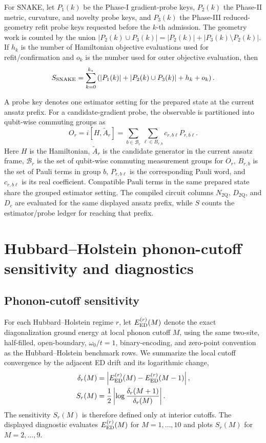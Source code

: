 \documentclass[
  reprint,
  amsmath,
  amssymb,
  aps,
  pra,
  nofootinbib,
  superscriptaddress,
  floatfix
]{revtex4-2}
\newcommand{\twq}{\mathrm{2Q}}
\begin{document}
For SNAKE, let \(P_1(k)\) be the Phase-I gradient-probe keys, \(P_2(k)\) the Phase-II metric, curvature, and novelty probe keys, and \(P_3(k)\) the Phase-III reduced-geometry refit probe keys requested before the \(k\)-th admission.  The geometry work is counted by the union \(|P_2(k)\cup P_3(k)|=|P_2(k)|+|P_3(k)\setminus P_2(k)|\).  If \(h_k\) is the number of Hamiltonian objective evaluations used for refit/confirmation and \(o_k\) is the number used for outer objective evaluation, then
\begin{equation}
S_{\rm SNAKE}
=
\sum_{k=0}^{k_\star}
\left(
|P_1(k)|+|P_2(k)\cup P_3(k)|+h_k+o_k
\right).
\label{eq:appendix_s_snake}
\end{equation}

A probe key denotes one estimator setting for the prepared state at the current ansatz prefix.  For a candidate-gradient probe, the observable is partitioned into qubit-wise commuting groups as
\begin{equation}
O_r=i[H,\widetilde A_r]
=\sum_{b\in\mathcal B_r}\sum_{\ell\in B_{r,b}}
c_{r,b\ell}P_{r,b\ell} .
\label{eq:appendix_grouped_gradient}
\end{equation}
Here \(H\) is the Hamiltonian, \(\widetilde A_r\) is the candidate generator in the current ansatz frame, \(\mathcal B_r\) is the set of qubit-wise commuting measurement groups for \(O_r\), \(B_{r,b}\) is the set of Pauli terms in group \(b\), \(P_{r,b\ell}\) is the corresponding Pauli word, and \(c_{r,b\ell}\) is its real coefficient. Compatible Pauli terms in the same prepared state share the grouped estimator setting.  The compiled circuit columns \(N_{\twq}\), \(D_{\twq}\), and \(D_c\) are evaluated for the same displayed ansatz prefix, while \(S\) counts the estimator/probe ledger for reaching that prefix.

\section{Hubbard--Holstein phonon-cutoff sensitivity and diagnostics}
\label{app:hh_stress_diagnostics}

\subsection{Phonon-cutoff sensitivity}
\label{app:hh_cutoff_sensitivity}

For each Hubbard--Holstein regime \(r\), let \(E_{\rm ED}^{(r)}(M)\) denote the
exact diagonalization ground energy at local phonon cutoff \(M\), using the same
two-site, half-filled, open-boundary, \(\omega_0/t=1\), binary-encoding, and
zero-point convention as the Hubbard--Holstein benchmark rows.  We summarize
the local cutoff convergence by the adjacent ED drift and its logarithmic
change,
\begin{align*}
\delta_r(M)
&=\left|E_{\rm ED}^{(r)}(M)-E_{\rm ED}^{(r)}(M-1)\right|,\\
S_r(M)
&=\frac{1}{2}\left|\log\frac{\delta_r(M+1)}{\delta_r(M)}\right|.
\end{align*}
The sensitivity \(S_r(M)\) is therefore defined only at interior cutoffs.  The
displayed diagnostic evaluates \(E_{\rm ED}^{(r)}(M)\) for \(M=1,\ldots,10\)
and plots \(S_r(M)\) for \(M=2,\ldots,9\).
\end{document}
